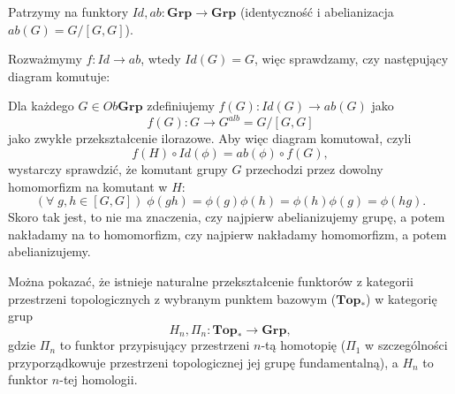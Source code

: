 \begin{example}
\item Patrzymy na funktory $Id, ab:\mathbf{Grp}\to\mathbf{Grp}$ (identyczność i abelianizacja $ab(G)=G/[G,G]$).

  Rozważmymy $f:Id\to ab$, wtedy $Id(G)=G$, więc sprawdzamy, czy następujący diagram komutuje:

  \begin{center}
  \end{center}

  Dla każdego $G\in Ob\mathbf{Grp}$ zdefiniujemy $f(G):Id(G)\to ab(G)$ jako
  $$f(G):G\to G^{alb}=G/[G,G]$$
  jako zwykłe przekształcenie ilorazowe. Aby więc diagram komutował, czyli
  $$f(H)\circ Id(\phi)=ab(\phi)\circ f(G),$$ 
  wystarczy sprawdzić, że komutant grupy $G$ przechodzi przez dowolny homomorfizm na komutant w $H$:
  $$(\forall\;g,h\in [G,G])\;\phi(gh)=\phi(g)\phi(h)=\phi(h)\phi(g)=\phi(hg).$$
  Skoro tak jest, to nie ma znaczenia, czy najpierw abelianizujemy grupę, a potem nakładamy na to homomorfizm, czy najpierw nakładamy homomorfizm, a potem abelianizujemy.

\item Można pokazać, że istnieje naturalne przekształcenie funktorów z kategorii przestrzeni topologicznych z wybranym punktem bazowym ($\mathbf{Top}_*$) w kategorię grup 
  $$H_n, \Pi_n:\mathbf{Top}_*\to\mathbf{Grp},$$
  gdzie $\Pi_n$ to funktor przypisujący przestrzeni $n$-tą homotopię ($\Pi_1$ w szczególności przyporządkowuje przestrzeni topologicznej jej grupę fundamentalną), a $H_n$ to funktor $n$-tej homologii.
  

\end{example}

